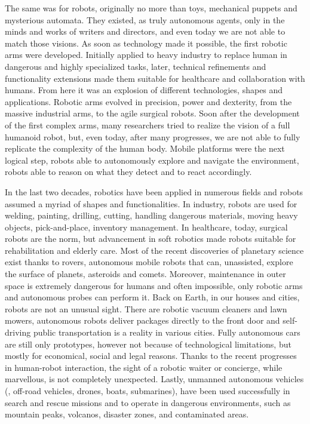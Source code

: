The same was for robots, originally no more than toys, mechanical puppets and mysterious automata. They existed, as truly autonomous agents, only in the minds and works of writers and directors, and even today we are not able to match those visions. As soon as technology made it possible, the first robotic arms were developed. Initially applied to heavy industry to replace human in dangerous and highly specialized tasks, later, technical refinements and functionality extensions made them suitable for healthcare and collaboration with humans. From here it was an explosion of different technologies, shapes and applications. Robotic arms evolved in precision, power and dexterity,  from the massive industrial arms, to the agile surgical robots.  Soon after the development of the first complex arms, many researchers tried to realize the vision of a full humanoid robot, but, even today, after many progresses, we are not able to fully replicate the complexity of the human body. Mobile platforms were the next logical step, robots able to autonomously explore and navigate the environment, robots able to reason on what they detect and to react accordingly.

In the last two decades, robotics have been applied in numerous fields and robots assumed a myriad of shapes and functionalities. In industry, robots are used for welding, painting, drilling, cutting, handling dangerous materials, moving heavy objects, pick-and-place, inventory management. In healthcare, today, surgical robots are the norm, but advancement in soft robotics made robots suitable for rehabilitation and elderly care. Most of the recent discoveries of planetary science exist thanks to rovers, autonomous mobile robots that can, unassisted, explore the surface of planets, asteroids and comets. Moreover, maintenance in outer space is extremely dangerous for humans and often impossible, only robotic arms and autonomous probes can perform it. Back on Earth, in our houses and cities, robots are not an unusual sight. There are robotic vacuum cleaners and lawn mowers,  autonomous robots deliver packages directly to the front door and self-driving public transportation is a reality in various cities. Fully autonomous cars are still only prototypes, however not because of technological limitations, but mostly for economical, social and legal reasons. Thanks to the recent progresses in human-robot interaction, the sight of a robotic waiter or concierge, while marvellous, is not completely unexpected. Lastly, unmanned autonomous vehicles (\eg, off-road vehicles, drones, boats, submarines),  have been used successfully in search and rescue missions and to operate in dangerous environments, such as mountain peaks, volcanos, disaster zones, and contaminated areas.

